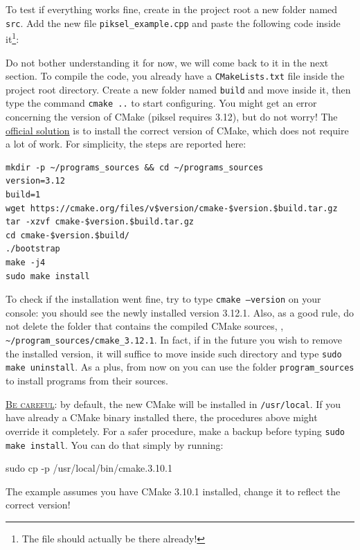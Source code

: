 \documentclass{article}
\begin{document}
To test if everything works fine, create in the project root a new folder named \texttt{src}. Add the new file \texttt{piksel\string_example.cpp} and paste the following code inside it\footnote{The file should actually be there already!}:



Do not bother understanding it for now, we will come back to it in the next section. To compile the code, you already have a \texttt{CMakeLists.txt} file inside the project root directory. Create a new folder named \texttt{build} and move inside it, then type the command \texttt{cmake~..} to start configuring. You might get an error concerning the version of CMake (piksel requires 3.12), but do not worry! The \href{https://bernhardfritz.github.io/piksel/#/gettingstarted/troubleshooting}{official solution} is to install the correct version of CMake, which does not require a lot of work. For simplicity, the steps are reported here:

\begin{lstlisting}[style=myterm]
mkdir -p ~/programs_sources && cd ~/programs_sources
version=3.12
build=1
wget https://cmake.org/files/v$version/cmake-$version.$build.tar.gz
tar -xzvf cmake-$version.$build.tar.gz
cd cmake-$version.$build/
./bootstrap
make -j4
sudo make install
\end{lstlisting}

To check if the installation went fine, try to type \texttt{cmake --version} on your console: you should see the newly installed version 3.12.1. Also, as a good rule, do not delete the folder that contains the compiled CMake sources, \eg, \texttt{\textasciitilde/program\string_sources/cmake\string_3.12.1}. In fact, if in the future you wish to remove the installed version, it will suffice to move inside such directory and type \texttt{sudo make uninstall}. As a plus, from now on you can use the folder \texttt{program\string_sources} to install programs from their sources.

\begin{mdframed}[hidealllines=true,backgroundcolor=red!20]
  \underline{\textsc{Be careful}}: by default, the new CMake will be installed in \texttt{/usr/local}. If you have already a CMake binary installed there, the procedures above might override it completely. For a safer procedure, make a backup before typing \texttt{sudo make install}. You can do that simply by running:
  \begin{center}
    \ttfamily
    sudo cp -p /usr/local/bin/cmake.3.10.1
  \end{center}
  The example assumes you have CMake 3.10.1 installed, change it to reflect the correct version!
\end{mdframed}
\end{document}

